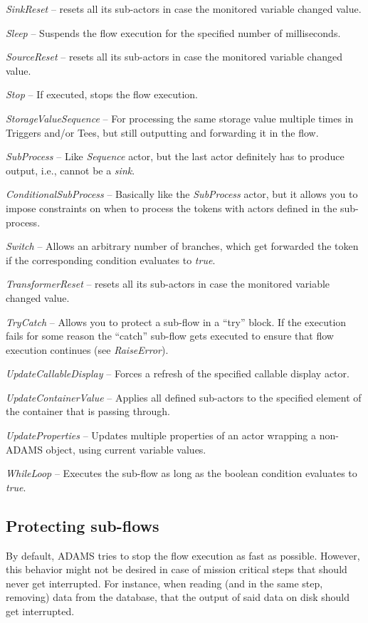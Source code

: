 \begin{tight_itemize}
	\item \textit{SinkReset} -- resets all its sub-actors in case the monitored
	variable changed value.
	\item \textit{Sleep} -- Suspends the flow execution for the specified number of
	milliseconds.
	\item \textit{SourceReset} -- resets all its sub-actors in case the monitored
	variable changed value.
	\item \textit{Stop} -- If executed, stops the flow execution.
	\item \textit{StorageValueSequence} -- For processing the same storage value
	multiple times in Triggers and/or Tees, but still outputting and forwarding
	it in the flow.
	\item \textit{SubProcess} -- Like \textit{Sequence} actor, but the last actor
	definitely has to produce output, i.e., cannot be a \textit{sink}.
	\item \textit{ConditionalSubProcess} -- Basically like the \textit{SubProcess}
	actor, but it allows you to impose constraints on when to process the tokens
	with actors defined in the sub-process.
	\item \textit{Switch} -- Allows an arbitrary number of branches, which get
	forwarded the token if the corresponding condition evaluates to \textit{true}.
	\item \textit{TransformerReset} -- resets all its sub-actors in case the monitored
	variable changed value.
	\item \textit{TryCatch} -- Allows you to protect a sub-flow in a ``try''
	block. If the execution fails for some reason the ``catch'' sub-flow gets
	executed to ensure that flow execution continues (see \textit{RaiseError}).
	\item \textit{UpdateCallableDisplay} -- Forces a refresh of the specified
	callable display actor.
	\item \textit{UpdateContainerValue} -- Applies all defined sub-actors to the
	specified element of the container that is passing through.
	\item \textit{UpdateProperties} -- Updates multiple properties of an actor
	wrapping a non-ADAMS object, using current variable values.
	\item \textit{WhileLoop} -- Executes the sub-flow as long as the boolean
	condition evaluates to \textit{true}.
\end{tight_itemize}

\subsection{Protecting sub-flows}
By default, ADAMS tries to stop the flow execution as fast as possible. However,
this behavior might not be desired in case of mission critical steps that should
never get interrupted. For instance, when reading (and in the same step, removing)
data from the database, that the output of said data on disk should get
interrupted.

